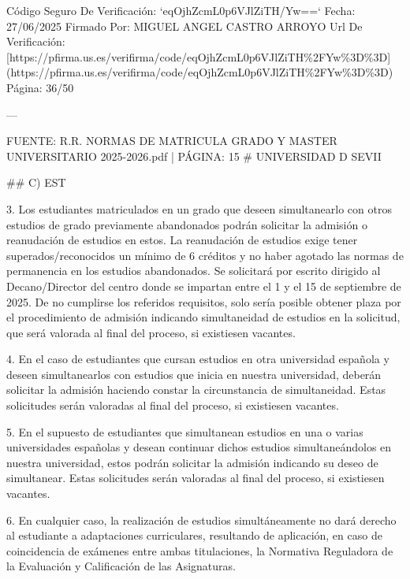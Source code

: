 \documentclass{article}
\begin{document}
\begin{itemize}
\begin{itemize}
\begin{scriptsize}
                  Código Seguro De Verificación: `eqOjhZcmL0p6VJlZiTH/Yw==`
                  Fecha: 27/06/2025
                  Firmado Por: MIGUEL ANGEL CASTRO ARROYO
                  Url De Verificación: [https://pfirma.us.es/verifirma/code/eqOjhZcmL0p6VJlZiTH\%2FYw\%3D\%3D](https://pfirma.us.es/verifirma/code/eqOjhZcmL0p6VJlZiTH\%2FYw\%3D\%3D)
                  Página: 36/50

                  ---

                  FUENTE: R.R. NORMAS DE MATRICULA GRADO Y MASTER UNIVERSITARIO 2025-2026.pdf | PÁGINA: 15
                  \# UNIVERSIDAD D SEVII

                  \#\# C) EST

                  3. Los estudiantes matriculados en un grado que deseen simultanearlo con otros estudios de grado previamente abandonados podrán solicitar la admisión o reanudación de estudios en estos. La reanudación de estudios exige tener superados/reconocidos un mínimo de 6 créditos y no haber agotado las normas de permanencia en los estudios abandonados. Se solicitará por escrito dirigido al Decano/Director del centro donde se impartan entre el 1 y el 15 de septiembre de 2025. De no cumplirse los referidos requisitos, solo sería posible obtener plaza por el procedimiento de admisión indicando simultaneidad de estudios en la solicitud, que será valorada al final del proceso, si existiesen vacantes.

                  4. En el caso de estudiantes que cursan estudios en otra universidad española y deseen simultanearlos con estudios que inicia en nuestra universidad, deberán solicitar la admisión haciendo constar la circunstancia de simultaneidad. Estas solicitudes serán valoradas al final del proceso, si existiesen vacantes.

                  5. En el supuesto de estudiantes que simultanean estudios en una o varias universidades españolas y desean continuar dichos estudios simultaneándolos en nuestra universidad, estos podrán solicitar la admisión indicando su deseo de simultanear. Estas solicitudes serán valoradas al final del proceso, si existiesen vacantes.

                  6. En cualquier caso, la realización de estudios simultáneamente no dará derecho al estudiante a adaptaciones curriculares, resultando de aplicación, en caso de coincidencia de exámenes entre ambas titulaciones, la Normativa Reguladora de la Evaluación y Calificación de las Asignaturas.


\end{scriptsize}
\end{itemize}
\end{itemize}
\end{document}
